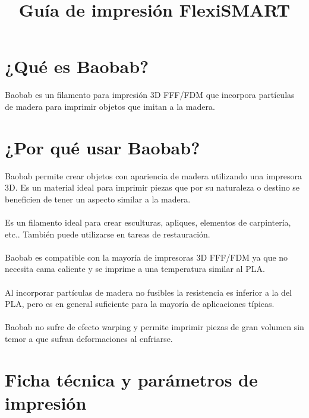 \documentclass[11pt,a4paper]{article}
\title{Guía de impresión FlexiSMART}
\date{}
\begin{document}

\section{¿Qué es Baobab?}Baobab es un filamento para impresión 3D FFF/FDM que incorpora partículas de madera para imprimir objetos que imitan a la madera. 
\section{¿Por qué usar Baobab?}
Baobab permite crear objetos con apariencia de madera utilizando una impresora 3D. Es un material ideal para imprimir piezas que por su naturaleza o destino se beneficien de tener un aspecto similar a la madera.\\\\
Es un filamento ideal para crear esculturas, apliques, elementos de carpintería, etc.. También puede utilizarse en tareas de restauración.\\\\
Baobab es compatible con la mayoría de impresoras 3D FFF/FDM ya que no necesita cama caliente y se imprime a una temperatura similar al PLA.\\\\
Al incorporar partículas de madera no fusibles la resistencia es inferior a la del PLA, pero es en general suficiente para la mayoría de aplicaciones típicas.\\\\
Baobab no sufre de efecto warping y permite imprimir piezas de gran volumen sin temor a que sufran deformaciones al enfriarse.\section{Ficha técnica y parámetros de impresión}
\end{document}
